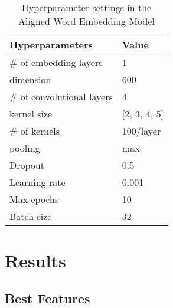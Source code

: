 \documentclass[11pt,a4paper]{article}
\begin{document}
\begin{table}[t]
  \begin{center}
  \begin{tabular}{|l|l|}
  \hline \bf Hyperparameters & \bf Value \\ \hline
  \# of embedding layers & 1 \\
  \hspace{0.5cm} dimension & 600 \\
  \# of convolutional layers & 4 \\
  \hspace{0.5cm} kernel size & [2, 3, 4, 5] \\
  \hspace{0.5cm} \# of kernels & 100/layer \\
  \hspace{0.5cm} pooling & max \\
  Dropout & 0.5 \\
  Learning rate & 0.001 \\
  Max epochs & 10 \\
  Batch size & 32 \\
  \hline
  \end{tabular}
  \end{center}
  \caption{\label{tab:cnn-hyperparams-table} Hyperparameter settings in the Aligned Word Embedding Model}
\end{table}

\section{Results}\label{sec:results}

\subsection{Best Features}
\end{document}
